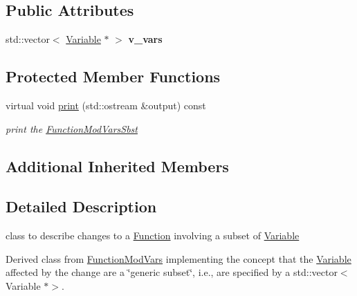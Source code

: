 \subsection*{Public Attributes}
\begin{DoxyCompactItemize}
\item 
\mbox{\label{class_s_m_spp__di__unipi__it_1_1_function_mod_vars_sbst_a77f73523ab3aa9276f7698308a7de6ed}} 
std\+::vector$<$ \mbox{\hyperlink{class_s_m_spp__di__unipi__it_1_1_variable}{Variable}} $\ast$ $>$ {\bfseries v\+\_\+vars}
\end{DoxyCompactItemize}
\subsection*{Protected Member Functions}
\begin{DoxyCompactItemize}
\item 
\mbox{\label{class_s_m_spp__di__unipi__it_1_1_function_mod_vars_sbst_a2e7b9c9148a98c5c342e8c25cac95926}} 
virtual void \mbox{\hyperlink{class_s_m_spp__di__unipi__it_1_1_function_mod_vars_sbst_a2e7b9c9148a98c5c342e8c25cac95926}{print}} (std\+::ostream \&output) const
\begin{DoxyCompactList}\small\item\em print the \mbox{\hyperlink{class_s_m_spp__di__unipi__it_1_1_function_mod_vars_sbst}{Function\+Mod\+Vars\+Sbst}} \end{DoxyCompactList}\end{DoxyCompactItemize}
\subsection*{Additional Inherited Members}


\subsection{Detailed Description}
class to describe changes to a \mbox{\hyperlink{class_s_m_spp__di__unipi__it_1_1_function}{Function}} involving a subset of \mbox{\hyperlink{class_s_m_spp__di__unipi__it_1_1_variable}{Variable}} 

Derived class from \mbox{\hyperlink{class_s_m_spp__di__unipi__it_1_1_function_mod_vars}{Function\+Mod\+Vars}} implementing the concept that the \mbox{\hyperlink{class_s_m_spp__di__unipi__it_1_1_variable}{Variable}} affected by the change are a \char`\"{}generic subset\char`\"{}, i.\+e., are specified by a std\+::vector$<$\+Variable $\ast$$>$. 

